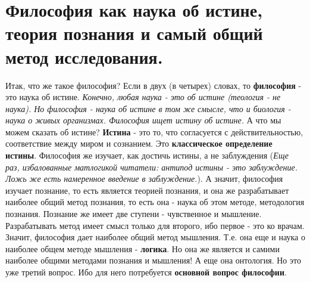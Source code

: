 \section{ Философия как наука об истине, теория познания и самый общий метод исследования.}
Итак, что же такое философия? Если в двух (в четырех) словах, то \textbf{философия} - это наука об истине. \textit{Конечно, любая наука - это об истине (теология - не наука). Но философия - наука об истине в том же смысле, что и биология - наука о живых организмах. Философия ищет истину об истине.} А что мы можем сказать об истине? \textbf{Истина} - это то, что согласуется с действительностью, соответствие между миром и сознанием. Это \textbf{классическое определение истины}. Философия же изучает, как достичь истины, а не заблуждения (\textit{Еще раз, избалованные матлогикой читатели: антипод истины - это заблуждение. Ложь же есть намеренное введение в заблуждение.}). А значит, философия изучает познание, то есть является теорией познания, и она же разрабатывает наиболее общий метод познания, то есть она - наука об этом методе, методология познания. Познание же имеет две ступени - чувственное и мышление. Разрабатывать метод имеет смысл только для второго, ибо первое - это ко врачам. Значит, философия дает наиболее общий метод мышления. Т.е. она еще и наука о наиболее общем методе мышления - \textbf{логика}. Но она же является и самими наиболее общими методами познания и мышления! А еще она онтология. Но это уже третий вопрос. Ибо для него потребуется \textbf{основной вопрос философии}.

